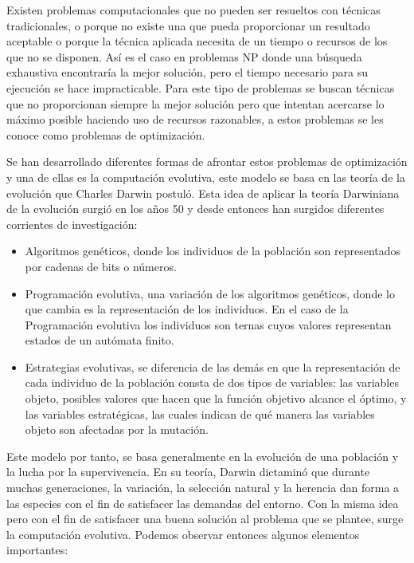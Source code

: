 Existen problemas computacionales que no pueden ser resueltos con técnicas tradicionales, o porque no existe una que pueda proporcionar un resultado aceptable o porque la técnica aplicada necesita de un tiempo o recursos de los que no se disponen. Así es el caso en problemas NP donde una búsqueda exhaustiva encontraría la mejor solución, pero el tiempo necesario para su ejecución se hace impracticable. Para este tipo de problemas se buscan técnicas que no proporcionan siempre la mejor soluci\'on pero que intentan acercarse lo máximo posible haciendo uso de recursos razonables, a estos problemas se les conoce como problemas de optimizaci\'on.

Se han desarrollado diferentes formas de afrontar estos problemas de optimizaci\'on y una de ellas es la computación evolutiva, este modelo se basa en las teoría de la evolución que Charles Darwin postul\'o. Esta idea de aplicar la teor\'ia Darwiniana de la evolución surgió en los a\~nos 50 y desde entonces han surgidos diferentes corrientes de investigación:

\begin{itemize}
	\item Algoritmos genéticos, donde los individuos de la población son representados por cadenas de bits o números.
	\item Programación evolutiva, una variación de los algoritmos genéticos, donde lo que cambia es la representación de los individuos. En el caso de la Programación evolutiva los individuos son ternas cuyos valores representan estados de un autómata finito. 
	\item Estrategias evolutivas, se diferencia de las demás en que la representación de cada individuo de la población consta de dos tipos de variables: las variables objeto, posibles valores que hacen que la función objetivo alcance el óptimo, y las variables estratégicas, las cuales indican de qué manera las variables objeto son afectadas por la mutación.
\end{itemize}

Este modelo por tanto, se basa generalmente en la evolución de una población y la lucha por la supervivencia. En su teoría, Darwin dictamin\'o que durante muchas generaciones, la variación, la selección natural y la herencia dan forma a las especies con el fin de satisfacer las demandas del entorno. Con la misma idea pero con el fin de satisfacer una buena solución al problema que se plantee, surge la computación evolutiva. Podemos observar entonces algunos elementos importantes:

